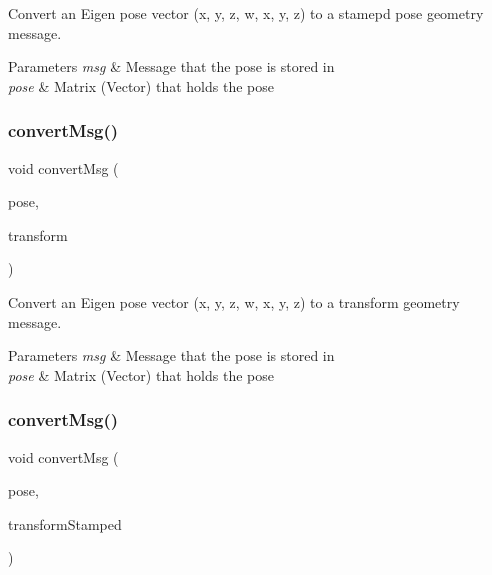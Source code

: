 Convert an Eigen pose vector (x, y, z, w, x, y, z) to a stamepd pose geometry message. 


\begin{DoxyParams}{Parameters}
{\em msg} & Message that the pose is stored in \\
\hline
{\em pose} & Matrix (Vector) that holds the pose \\
\hline
\end{DoxyParams}
\mbox{\label{group__transport__controller_ga45b2bbef58d2c60ff8eeb77d221f2ab7}} 
\subsubsection{\texorpdfstring{convert\+Msg()}{convertMsg()}\hspace{0.1cm}{\footnotesize\ttfamily [10/13]}}
{\footnotesize\ttfamily void convert\+Msg (\begin{DoxyParamCaption}\item[{geometry\+\_\+msgs\+::\+Pose \&}]{pose,  }\item[{geometry\+\_\+msgs\+::\+Transform \&}]{transform }\end{DoxyParamCaption})}



Convert an Eigen pose vector (x, y, z, w, x, y, z) to a transform geometry message. 


\begin{DoxyParams}{Parameters}
{\em msg} & Message that the pose is stored in \\
\hline
{\em pose} & Matrix (Vector) that holds the pose \\
\hline
\end{DoxyParams}
\mbox{\label{group__transport__controller_gaf99f4d3d714176ee5a3d235ffabb7d3f}} 
\subsubsection{\texorpdfstring{convert\+Msg()}{convertMsg()}\hspace{0.1cm}{\footnotesize\ttfamily [11/13]}}
{\footnotesize\ttfamily void convert\+Msg (\begin{DoxyParamCaption}\item[{geometry\+\_\+msgs\+::\+Pose\+Stamped \&}]{pose,  }\item[{geometry\+\_\+msgs\+::\+Transform\+Stamped \&}]{transform\+Stamped }\end{DoxyParamCaption})}



